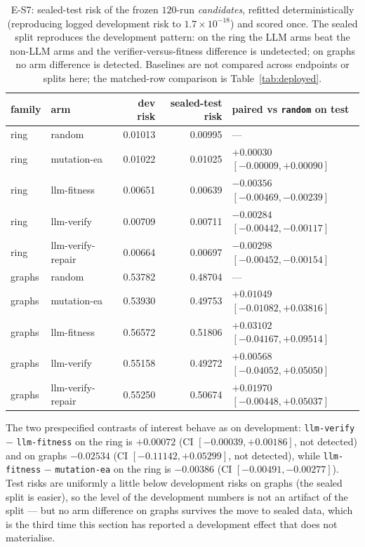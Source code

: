 \documentclass[11pt]{article}
\begin{document}
\begin{table}[t]
\centering
\caption{E-S7: sealed-test risk of the frozen $120$-run \emph{candidates}, refitted
deterministically (reproducing logged development risk to $1.7\times10^{-18}$) and scored
once. The sealed split reproduces the development pattern: on the ring the LLM arms beat the
non-LLM arms and the verifier-versus-fitness difference is undetected; on graphs no arm
difference is detected. Baselines are not compared across endpoints or splits here; the
matched-row comparison is Table~\ref{tab:deployed}.}
\label{tab:holdout}
\small
\begin{tabular}{@{}llrrl@{}}
\toprule
family & arm & dev risk & sealed-test risk & paired vs \texttt{random} on test \\
\midrule
ring & random            & 0.01013 & 0.00995 & --- \\
ring & mutation-ea       & 0.01022 & 0.01025 & $+0.00030$ $[-0.00009,+0.00090]$ \\
ring & llm-fitness       & 0.00651 & 0.00639 & $\mathbf{-0.00356}$ $[-0.00469,-0.00239]$ \\
ring & llm-verify        & 0.00709 & 0.00711 & $\mathbf{-0.00284}$ $[-0.00442,-0.00117]$ \\
ring & llm-verify-repair & 0.00664 & 0.00697 & $\mathbf{-0.00298}$ $[-0.00452,-0.00154]$ \\
\midrule
graphs & random          & 0.53782 & 0.48704 & --- \\
graphs & mutation-ea     & 0.53930 & 0.49753 & $+0.01049$ $[-0.01082,+0.03816]$ \\
graphs & llm-fitness     & 0.56572 & 0.51806 & $+0.03102$ $[-0.04167,+0.09514]$ \\
graphs & llm-verify      & 0.55158 & 0.49272 & $+0.00568$ $[-0.04052,+0.05050]$ \\
graphs & llm-verify-repair & 0.55250 & 0.50674 & $+0.01970$ $[-0.00448,+0.05037]$ \\
\bottomrule
\end{tabular}
\end{table}

The two prespecified contrasts of interest behave as on development:
\texttt{llm-verify} $-$ \texttt{llm-fitness} on the ring is $+0.00072$
(CI $[-0.00039,+0.00186]$, not detected) and on graphs $-0.02534$
(CI $[-0.11142,+0.05299]$, not detected), while \texttt{llm-fitness} $-$
\texttt{mutation-ea} on the ring is $-0.00386$ (CI $[-0.00491,-0.00277]$). Test risks are
uniformly a little below development risks on graphs (the sealed split is easier), so the
level of the development numbers is not an artifact of the split --- but no arm difference on
graphs survives the move to sealed data, which is the third time this section has reported a
development effect that does not materialise.
\end{document}
